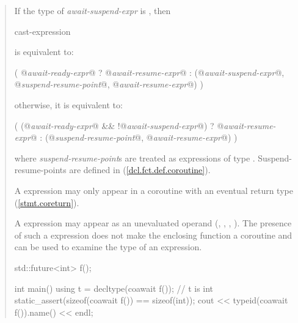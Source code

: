 \begin{quote}
If the type of \textit{await-suspend-expr} is \cvvoid, then

\begin{ncbnf}
   cast-expression
\end{ncbnf}
is equivalent to:
\begin{codeblock}
(
    @\textit{await-ready-expr}@ ? @\textit{await-resume-expr}@
    : (@\textit{await-suspend-expr}@, @\textit{suspend-resume-point}@, @\textit{await-resume-expr}@)
)
\end{codeblock}

otherwise, it is equivalent to:

\begin{codeblock}
(
    (@\textit{await-ready-expr}@ && !@\textit{await-suspend-expr}@) ? @\textit{await-resume-expr}@
    : (@\textit{suspend-resume-point}@, @\textit{await-resume-expr}@)
)
\end{codeblock}

where \textit{suspend-resume-point}s are treated as  expressions of type . Suspend-resume-points are defined in (\ref{dcl.fct.def.coroutine}).

\pnum
A  expression may only appear in a coroutine 
with an eventual return type (\ref{stmt.coreturn}).

\pnum
\enternote
A  expression may appear as an unevaluated operand (, , , ). The presence of such a  expression does not make the enclosing function a coroutine and can be used to examine the type of an  expression.

\enterexample
\begin{codeblock}	
  std::future<int> f();
  
  int main() {
    using t = decltype(coawait f()); // t is int
    static_assert(sizeof(coawait f()) == sizeof(int));
    cout << typeid(coawait f()).name() << endl;
  }
\end{codeblock}
\exitexample%
\exitnote

\end{quote}
%
%
%
